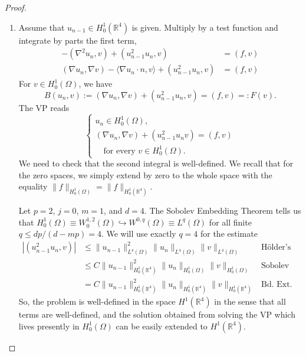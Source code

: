 \documentclass[letterpaper,twoside,11pt]{article}
\theoremstyle{mystyle}
\newcommand{\R}{{\mathbb R}}
\newcommand{\cblu}{\color{blue}}
\begin{document}
\cblu
\begin{proof}
  \begin{enumerate}
    \item Assume that $u_{n-1} \in H_0^1 \left( \R^4 \right)$ is given. Multiply by a test function and integrate by parts the first term, 
    \begin{align*}
      -\left( \nabla^2 u_n, v \right) + \left( u_{n-1}^2 u_n ,v \right) &= \left( f, v \right)\\
      \left( \nabla u_n, \nabla v \right) - \langle \nabla u_n \cdot n, v\rangle + \left( u_{n-1}^2 u_n ,v \right) &= \left( f, v \right) 
    \end{align*}
    For $v \in H_0^1 \left( \Omega \right)$, we have 
    \[B(u_n, v) := \left( \nabla u_n, \nabla v \right) + \left( u_{n-1}^2 u_n ,v \right) = \left( f, v \right)=: F(v) .\]
    The VP reads 
    \[\left\{ {\begin{array}{*{20}{l}}
      u_n \in H_0^1(\Omega), \\[.2cm]
      \left( \nabla u_n, \nabla v \right) + \left( u_{n-1}^2 u_n v \right) = \left( f, v \right)\\[.2cm]
      \quad \text{for every } v\in H_0^1 \left( \Omega \right).
    \end{array}} \right.\]
    We need to check that the second integral is well-defined. 
    We recall that for the zero spaces, we simply extend by zero to the whole space with the equality $\|f\|_{H_0^1 (\Omega)} = \|f\|_{H_0^1(\R^4)}$. 

    Let $p = 2$, $j = 0$, $m = 1$, and $d = 4$. The Sobolev Embedding Theorem tells us that $H_0^1 (\Omega) \equiv W_0^{1, 2} \left( \Omega \right)\hookrightarrow W^{0,q}\left( \Omega \right)\equiv L^q \left( \Omega \right)$ for all finite $q \leq dp/(d-mp) = 4$. We will use exactly $q = 4$ for the estimate
    \begin{align*}
      |\left( u_{n-1}^2u_n, v \right)| &\leq \|u_{n-1}\|^2_{L^4(\Omega)} \|u_n \|_{L^4(\Omega)} \|v\|_{L^4(\Omega)}  &\text{H\"older's}\\
      &\leq C\|u_{n-1}\|^2_{H_0^1(\R^4)} \|u_n \|_{H_0^1(\Omega)} \|v\|_{H_0^1(\Omega)}  &\text{Sobolev Emb.}\\
      &= C\|u_{n-1}\|^2_{H_0^1(\R^4)} \|u_n \|_{H_0^1(\R^4)} \|v\|_{H_0^1(\R^4)}  &\text{Bd. Ext. Op.}
    \end{align*}
    So, the problem is well-defined in the space $H^1 (\R^4)$ in the sense that all terms are well-defined, and the solution obtained from solving the VP which lives presently in $H_0^1 \left( \Omega \right)$ can be easily extended to $H^1 \left( \R^4 \right)$. 


\end{enumerate}
\end{proof}
\end{document}
